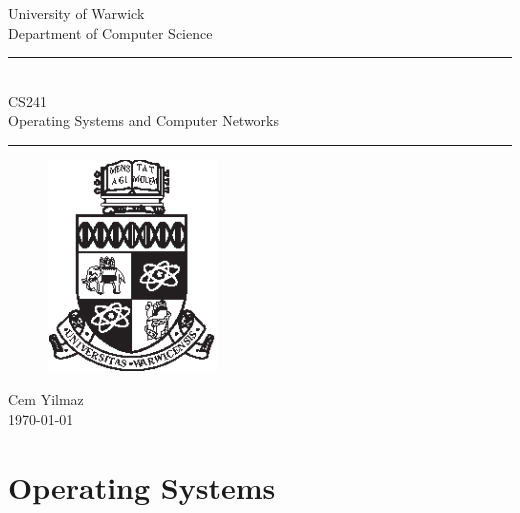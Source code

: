 \documentclass[a4paper]{article}
\theoremstyle{plain}
\theoremstyle{definition}
\theoremstyle{remark}
\begin{document}
	\begin{titlepage}
	\begin{center}
	\large
	University of Warwick \\
	Department of Computer Science \\
	\huge
	\vspace{50mm}
	\rule{\linewidth}{0.5pt} \\
	CS241 \\
	\vspace{5mm}
	\Large
	Operating Systems and Computer Networks
	\rule{\linewidth}{0.5pt}
	\vspace{5mm}
	\begin{figure}[H]
	\centering
	\includegraphics[width=0.4\textwidth]{crest_black.eps}
	\end{figure}
	\vspace{37mm}
	Cem Yilmaz \\
	\today
	\end{center}
	\end{titlepage}
	\tableofcontents
	\newpage
	\section{Operating Systems}
	
\end{document}
